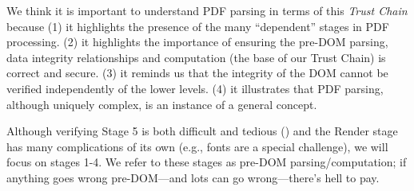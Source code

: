 We think it is important to understand PDF parsing in terms of this
\emph{Trust Chain} because
%
(1) it highlights the presence of the many ``dependent'' stages
in PDF processing.
%
(2) it highlights the importance of ensuring the pre-DOM parsing, data integrity relationships and
computation (the base of our Trust Chain) is correct and secure.
%
(3) it reminds us that the integrity of the DOM cannot be verified
independently of the lower levels.
%
(4) it illustrates that PDF parsing, although uniquely complex, is an instance of
a general concept.

Although verifying Stage 5 is both difficult and tedious
()
and the Render stage has many complications of its own (e.g., fonts are
a special challenge), we will focus on stages 1-4.
We refer to these stages as pre-DOM parsing/computation; if anything
goes wrong pre-DOM---and lots can go wrong---there's hell to pay. 
